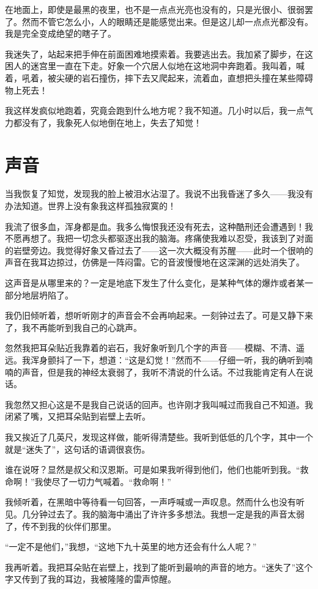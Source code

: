 \documentclass[10pt]{book}
\begin{document}
在地面上，即使是最黑的夜里，也不是一点点光亮也没有的，只是光很小、很弱罢了。然而不管它怎么小，人的眼睛还是能感觉出来。但是这儿却一点点光都没有。我是完全变成绝望的瞎子了。

我迷失了，站起来把手伸在前面困难地摸索着。我要逃出去。我加紧了脚步，在这困人的迷宫里一直在下走。好象一个穴居人似地在这地洞中奔跑着。我叫着，喊着，吼着，被尖硬的岩石撞伤，摔下去又爬起来，流着血，直想把头撞在某些障碍物上死去！

我这样发疯似地跑着，究竟会跑到什么地方呢？我不知道。几小时以后，我一点气力都没有了，我象死人似地倒在地上，失去了知觉！
\chapter{声音}
当我恢复了知觉，发现我的脸上被泪水沾湿了。我说不出我昏迷了多久——我没有办法知道。世界上没有象我这样孤独寂寞的！

我流了很多血，浑身都是血。我多么悔恨我还没有死去，这种酷刑还会遭遇到！我不愿再想了。我把一切念头都驱逐出我的脑海。疼痛使我难以忍受，我该到了对面的岩壁旁边。我觉得好象又昏过去了——这一次大概没有苏醒——此时一个很响的声音在我耳边掠过，仿佛是一阵闷雷。它的音波慢慢地在这深渊的远处消失了。

这声音是从哪里来的？一定是地底下发生了什么变化，是某种气体的爆炸或者某一部分地层坍陷了。

我仍旧倾听着，想听听刚才的声音会不会再响起来。一刻钟过去了。可是又静下来了，我不再能听到我自己的心跳声。

忽然我把耳朵贴近我靠着的岩石，我好象听到几个字的声音——模糊、不清、遥远。我浑身颤抖了一下，想道：“这是幻觉！”然而不——仔细一听，我的确听到喃喃的声音，但是我的神经太衰弱了，我听不清说的什么话。不过我能肯定有人在说话。

我忽然又担心这是不是我自己说话的回声。也许刚才我叫喊过而我自己不知道。我闭紧了嘴，又把耳朵贴到岩壁上去听。

我又挨近了几英尺，发现这样做，能听得清楚些。我听到低低的几个字，其中一个就是“迷失了”，这句话的语调很哀伤。

谁在说呀？显然是叔父和汉恩斯。可是如果我听得到他们，他们也能听到我。“救命啊！”我使尽了一切力气喊着。“救命啊！”

我倾听着，在黑暗中等待看一句回答，一声呼喊或一声叹息。然而什么也没有听见。几分钟过去了。我的脑海中涌出了许许多多想法。我想一定是我的声音太弱了，传不到我的伙伴们那里。

“一定不是他们，”我想，“这地下九十英里的地方还会有什么人呢？”

我再听着。我把耳朵贴在岩壁上，找到了能听到最响的声音的地方。“迷失了”这个字又传到了我的耳边，我被隆隆的雷声惊醒。
\end{document}
